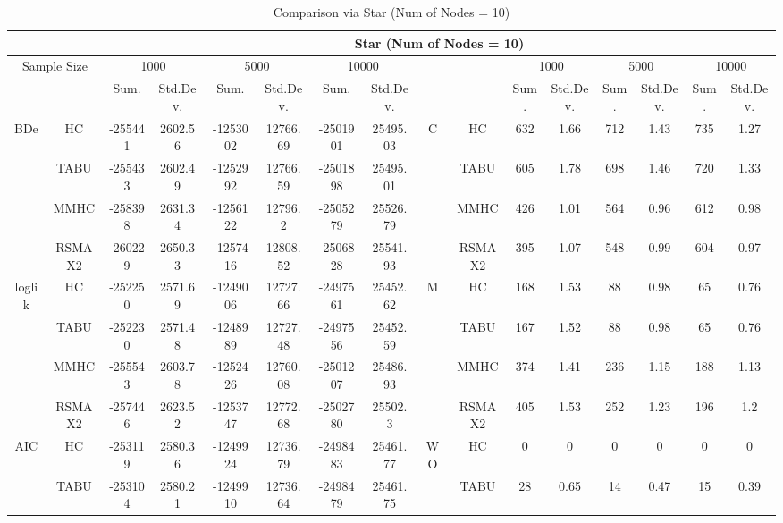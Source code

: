 \begin{table}[p]																										
\centering	\caption{Comparison via Star (Num of Nodes = 10)}	\tiny																						
{\tabcolsep=0.01in																										
\begin{tabular}{cc||cc|cc|cc||cc|cc|cc|cc}																										
\hline																										
&	&	\multicolumn{14}{c}{Star	(Num	of	Nodes	=	10)}\tabularnewline																			
\hline																										
\multicolumn{2}{c||}{Sample	Size}	&	\multicolumn{2}{c|}{1000}	&	\multicolumn{2}{c|}{5000}	&	\multicolumn{2}{c||}{10000}	&	&	&	\multicolumn{2}{c|}{1000}	&	\multicolumn{2}{c|}{5000}	&	\multicolumn{2}{c}{10000}\tabularnewline											
\hline																										
&	&	Sum.	&	Std.Dev.	&	Sum.	&	Std.Dev.	&	Sum.	&	Std.Dev.	&	&	&	Sum.	&	Std.Dev.	&	Sum.	&	Std.Dev.	&	Sum.	&	Std.Dev.\tabularnewline
\hline																										
\hline																										
\multirow{4}{*}{BDe} & HC &	-255441 & 	2602.56 & 	-1253002 & 	12766.69 & 	-2501901 & 	25495.03 & 	\multirow{4}{*}{C} & HC &	632 & 	1.66 & 	712 & 	1.43 & 	735 & 	1.27\tabularnewline													
& TABU &	-255433 & 	2602.49 & 	-1252992 & 	12766.59 & 	-2501898 & 	25495.01 & 	& TABU &	605 & 	1.78 & 	698 & 	1.46 & 	720 & 	1.33\tabularnewline													
& MMHC &	-258398 & 	2631.34 & 	-1256122 & 	12796.2 & 	-2505279 & 	25526.79 & 	& MMHC &	426 & 	1.01 & 	564 & 	0.96 & 	612 & 	0.98\tabularnewline													
& RSMAX2 &	-260229 & 	2650.33 & 	-1257416 & 	12808.52 & 	-2506828 & 	25541.93 & 	& RSMAX2 &	395 & 	1.07 & 	548 & 	0.99 & 	604 & 	0.97\tabularnewline													
\hline																										
\multirow{4}{*}{loglik} & HC &	-252250 & 	2571.69 & 	-1249006 & 	12727.66 & 	-2497561 & 	25452.62 & 	\multirow{4}{*}{M} & HC &	168 & 	1.53 & 	88 & 	0.98 & 	65 & 	0.76\tabularnewline													
& TABU &	-252230 & 	2571.48 & 	-1248989 & 	12727.48 & 	-2497556 & 	25452.59 & 	& TABU &	167 & 	1.52 & 	88 & 	0.98 & 	65 & 	0.76\tabularnewline													
& MMHC &	-255543 & 	2603.78 & 	-1252426 & 	12760.08 & 	-2501207 & 	25486.93 & 	& MMHC &	374 & 	1.41 & 	236 & 	1.15 & 	188 & 	1.13\tabularnewline													
& RSMAX2 &	-257446 & 	2623.52 & 	-1253747 & 	12772.68 & 	-2502780 & 	25502.3 & 	& RSMAX2 &	405 & 	1.53 & 	252 & 	1.23 & 	196 & 	1.2\tabularnewline													
\hline																										
\multirow{4}{*}{AIC} & HC &	-253119 & 	2580.36 & 	-1249924 & 	12736.79 & 	-2498483 & 	25461.77 & 	\multirow{4}{*}{WO} & HC &	0 & 	0 & 	0 & 	0 & 	0 & 	0\tabularnewline													
& TABU &	-253104 & 	2580.21 & 	-1249910 & 	12736.64 & 	-2498479 & 	25461.75 & 	& TABU &	28 & 	0.65 & 	14 & 	0.47 & 	15 & 	0.39\tabularnewline													

\end{tabular}}
\end{table}
